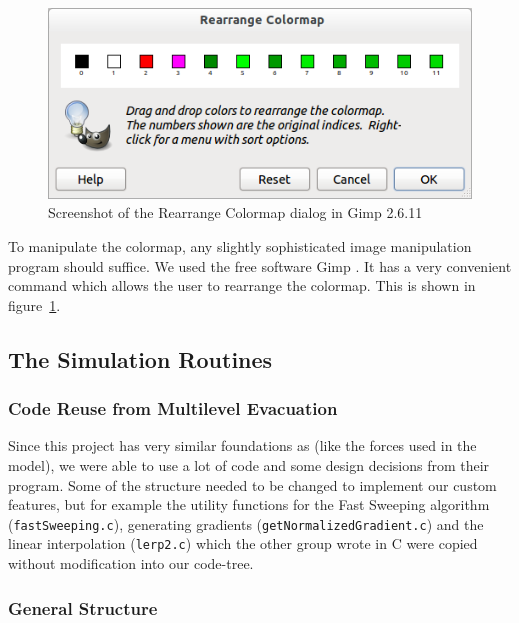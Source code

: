 \documentclass[11pt]{article}
\begin{document}
\begin{figure}[h]
	\centering
	\includegraphics[scale=0.5]{images/gimp.png}
	\caption{Screenshot of the Rearrange Colormap dialog in Gimp 2.6.11}
	\label{gimpscreenshot}
	
\end{figure}
To manipulate the colormap, any slightly sophisticated image manipulation
program should suffice. We used the free software Gimp \cite{gimp}. It has a
very convenient command which allows the user to rearrange the colormap. This
is shown in figure~\ref{gimpscreenshot}.

\subsection{The Simulation Routines}
\label{sub:The simulation Routines}

\subsubsection{Code Reuse from Multilevel Evacuation}

Since this project has very similar foundations as \cite{multilevel} (like the
forces used in the model), we were able to use a lot of code and some design
decisions from their program.  Some of the structure needed to be changed to
implement our custom features, but for example the utility functions for the
Fast Sweeping algorithm (\texttt{fastSweeping.c}), generating gradients
(\texttt{getNormalizedGradient.c}) and the linear interpolation
(\texttt{lerp2.c}) which the other group wrote in C were copied without
modification into our code-tree.

\subsubsection{General Structure}

\label{sub:structure}
\end{document}
